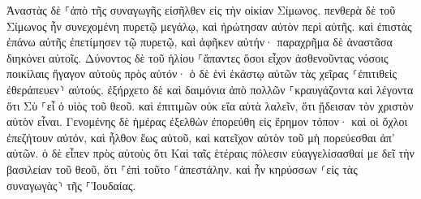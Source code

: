 \documentclass{openreader}
\begin{document}
Ἀναστὰς δὲ ⸀ἀπὸ τῆς συναγωγῆς εἰσῆλθεν εἰς τὴν οἰκίαν Σίμωνος. πενθερὰ δὲ τοῦ Σίμωνος ἦν συνεχομένη πυρετῷ μεγάλῳ, καὶ ἠρώτησαν αὐτὸν περὶ αὐτῆς. 
καὶ ἐπιστὰς ἐπάνω αὐτῆς ἐπετίμησεν τῷ πυρετῷ, καὶ ἀφῆκεν αὐτήν· παραχρῆμα δὲ ἀναστᾶσα διηκόνει αὐτοῖς. 
Δύνοντος δὲ τοῦ ἡλίου ⸀ἅπαντες ὅσοι εἶχον ἀσθενοῦντας νόσοις ποικίλαις ἤγαγον αὐτοὺς πρὸς αὐτόν· ὁ δὲ ἑνὶ ἑκάστῳ αὐτῶν τὰς χεῖρας ⸂ἐπιτιθεὶς ἐθεράπευεν⸃ αὐτούς. 
ἐξήρχετο δὲ καὶ δαιμόνια ἀπὸ πολλῶν ⸀κραυγάζοντα καὶ λέγοντα ὅτι Σὺ ⸀εἶ ὁ υἱὸς τοῦ θεοῦ. καὶ ἐπιτιμῶν οὐκ εἴα αὐτὰ λαλεῖν, ὅτι ᾔδεισαν τὸν χριστὸν αὐτὸν εἶναι. 
Γενομένης δὲ ἡμέρας ἐξελθὼν ἐπορεύθη εἰς ἔρημον τόπον· καὶ οἱ ὄχλοι ἐπεζήτουν αὐτόν, καὶ ἦλθον ἕως αὐτοῦ, καὶ κατεῖχον αὐτὸν τοῦ μὴ πορεύεσθαι ἀπ’ αὐτῶν. 
ὁ δὲ εἶπεν πρὸς αὐτοὺς ὅτι Καὶ ταῖς ἑτέραις πόλεσιν εὐαγγελίσασθαί με δεῖ τὴν βασιλείαν τοῦ θεοῦ, ὅτι ⸀ἐπὶ τοῦτο ⸀ἀπεστάλην. 
καὶ ἦν κηρύσσων ⸂εἰς τὰς συναγωγὰς⸃ τῆς ⸀Ἰουδαίας. 
\end{document}
